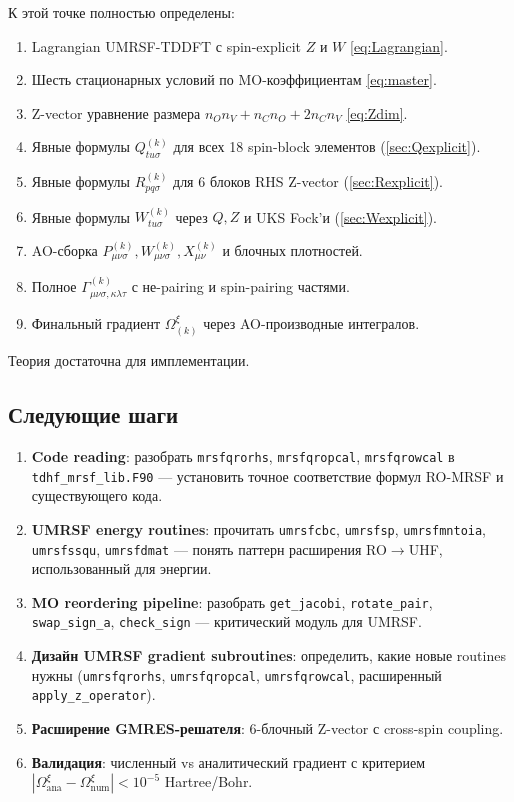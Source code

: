 \documentclass[11pt, a4paper]{article}
\theoremstyle{definition}
\begin{document}
К этой точке полностью определены:
\begin{enumerate}
    \item Lagrangian UMRSF-TDDFT с spin-explicit $Z$ и $W$ \eqref{eq:Lagrangian}.
    \item Шесть стационарных условий по MO-коэффициентам \eqref{eq:master}.
    \item Z-vector уравнение размера $n_O n_V + n_C n_O + 2 n_C n_V$ \eqref{eq:Zdim}.
    \item Явные формулы $Q^{(k)}_{tu\sigma}$ для всех 18 spin-block элементов (\cref{sec:Qexplicit}).
    \item Явные формулы $R^{(k)}_{pq\sigma}$ для 6 блоков RHS Z-vector (\cref{sec:Rexplicit}).
    \item Явные формулы $W^{(k)}_{tu\sigma}$ через $Q, Z$ и UKS Fock'и (\cref{sec:Wexplicit}).
    \item AO-сборка $P^{(k)}_{\mu\nu\sigma}, W^{(k)}_{\mu\nu\sigma}, X^{(k)}_{\mu\nu}$ и блочных плотностей.
    \item Полное $\Gamma^{(k)}_{\mu\nu\sigma, \kappa\lambda\tau}$ с не-pairing и spin-pairing частями.
    \item Финальный градиент $\Omega^\xi_{(k)}$ через AO-производные интегралов.
\end{enumerate}

Теория достаточна для имплементации.

\subsection{Следующие шаги}

\begin{enumerate}
    \item \textbf{Code reading}: разобрать \texttt{mrsfqrorhs}, \texttt{mrsfqropcal}, \texttt{mrsfqrowcal} в \texttt{tdhf\_mrsf\_lib.F90} --- установить точное соответствие формул RO-MRSF и существующего кода.
    \item \textbf{UMRSF energy routines}: прочитать \texttt{umrsfcbc}, \texttt{umrsfsp}, \texttt{umrsfmntoia}, \texttt{umrsfssqu}, \texttt{umrsfdmat} --- понять паттерн расширения RO$\to$UHF, использованный для энергии.
    \item \textbf{MO reordering pipeline}: разобрать \texttt{get\_jacobi}, \texttt{rotate\_pair}, \texttt{swap\_sign\_a}, \texttt{check\_sign} --- критический модуль для UMRSF.
    \item \textbf{Дизайн UMRSF gradient subroutines}: определить, какие новые routines нужны (\texttt{umrsfqrorhs}, \texttt{umrsfqropcal}, \texttt{umrsfqrowcal}, расширенный \texttt{apply\_z\_operator}).
    \item \textbf{Расширение GMRES-решателя}: 6-блочный Z-vector с cross-spin coupling.
    \item \textbf{Валидация}: численный vs аналитический градиент с критерием $|\Omega^\xi_{\text{ana}} - \Omega^\xi_{\text{num}}| < 10^{-5}$ Hartree/Bohr.
\end{enumerate}
\end{document}
